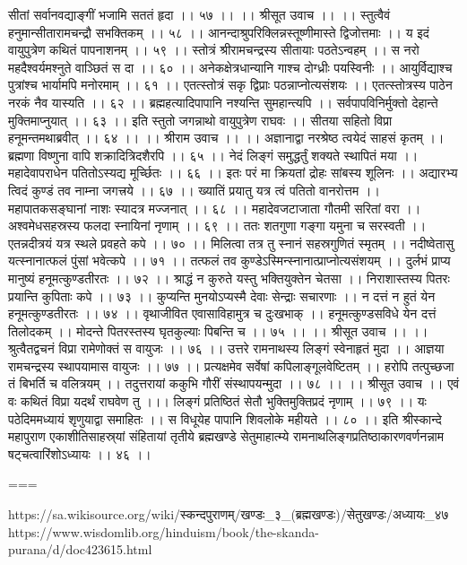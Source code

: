 सीतां सर्वानवद्याङ्गीं भजामि सततं हृदा ।। ५७ ।।
।। श्रीसूत उवाच ।। ।।
स्तुत्वैवं हनुमान्सीतारामचन्द्रौ सभक्तिकम् ।। ५८ ।।
आनन्दाश्रुपरिक्लिन्नस्तूष्णीमास्ते द्विजोत्तमाः ।।
य इदं वायुपुत्रेण कथितं पापनाशनम् ।। ५९ ।।
स्तोत्रं श्रीरामचन्द्रस्य सीतायाः पठतेऽन्वहम् ।।
स नरो महदैश्वर्यमश्नुते वाञ्छितं स दा ।। ६० ।।
अनेकक्षेत्रधान्यानि गाश्च दोग्ध्रीः पयस्विनीः ।।
आयुर्विद्याश्च पुत्रांश्च भार्यामपि मनोरमाम् ।। ६१ ।।
एतत्स्तोत्रं सकृ द्विप्राः पठन्नाप्नोत्यसंशयः ।।
एतत्स्तोत्रस्य पाठेन नरकं नैव यास्यति ।। ६२ ।।
ब्रह्महत्यादिपापानि नश्यन्ति सुमहान्त्यपि ।।
सर्वपापविनिर्मुक्तो देहान्ते मुक्तिमाप्नुयात् ।। ६३ ।।
इति स्तुतो जगन्नाथो वायुपुत्रेण राघवः ।।
सीतया सहितो विप्रा हनूमन्तमथाब्रवीत् ।। ६४ ।।
।। श्रीराम उवाच ।। ।।
अज्ञानाद्वा नरश्रेष्ठ त्वयेदं साहसं कृतम् ।।
ब्रह्मणा विष्णुना वापि शक्रादित्रिदशैरपि ।। ६५ ।।
नेदं लिङ्गं समुद्धर्तुं शक्यते स्थापितं मया ।।
महादेवापराधेन पतितोऽस्यद्य मूर्च्छितः ।। ६६ ।।
इतः परं मा क्रियतां द्रोहः सांबस्य शूलिनः ।।
अद्यारभ्य त्विदं कुण्डं तव नाम्ना जगत्त्रये ।। ६७ ।।
ख्यातिं प्रयातु यत्र त्वं पतितो वानरोत्तम ।।
महापातकसङ्घानां नाशः स्यादत्र मज्जनात् ।। ६८ ।।
महादेवजटाजाता गौतमी सरितां वरा ।।
अश्वमेधसहस्रस्य फलदा स्नायिनां नृणाम् ।। ६९ ।।
ततः शतगुणा गङ्गा यमुना च सरस्वती ।।
एतन्नदीत्रयं यत्र स्थले प्रवहते कपे ।। ७० ।।
मिलित्वा तत्र तु स्नानं सहस्रगुणितं स्मृतम् ।।
नदीष्वेतासु यत्स्नानात्फलं पुंसां भवेत्कपे ।। ७१ ।।
तत्फलं तव कुण्डेऽस्मिन्स्नानात्प्राप्नोत्यसंशयम् ।।
दुर्लभं प्राप्य मानुष्यं हनूमत्कुण्डतीरतः ।। ७२ ।।
श्राद्धं न कुरुते यस्तु भक्तियुक्तेन चेतसा ।।
निराशास्तस्य पितरः प्रयान्ति कुपिताः कपे ।। ७३ ।।
कुप्यन्ति मुनयोऽप्यस्मै देवाः सेन्द्राः सचारणाः ।।
न दत्तं न हुतं येन हनूमत्कुण्डतीरतः ।। ७४ ।।
वृथाजीवित एवासाविहामुत्र च दुःखभाक् ।।
हनूमत्कुण्डसविधे येन दत्तं तिलोदकम् ।।
मोदन्ते पितरस्तस्य घृतकुल्याः पिबन्ति च ।। ७५ ।।
।। श्रीसूत उवाच ।। ।।
श्रुत्वैतद्वचनं विप्रा रामेणोक्तं स वायुजः ।। ७६ ।।
उत्तरे रामनाथस्य लिङ्गं स्वेनाहृतं मुदा ।।
आज्ञया रामचन्द्रस्य स्थापयामास वायुजः ।। ७७ ।।
प्रत्यक्षमेव सर्वेषां कपिलाङ्गूलवेष्टितम् ।।
हरोपि तत्पुच्छजा तं बिभर्ति च वलित्रयम् ।।
तदुत्तरायां ककुभि गौरीं संस्थापयन्मुदा ।। ७८ ।।
।। श्रीसूत उवाच ।।
एवं वः कथितं विप्रा यदर्थं राघवेण तु ।।।
लिङ्गं प्रतिष्ठितं सेतौ भुक्तिमुक्तिप्रदं नृणाम् ।। ७९ ।।
यः पठेदिममध्यायं शृणुयाद्वा समाहितः ।।
स विधूयेह पापानि शिवलोके महीयते ।। ८० ।।
इति श्रीस्कान्दे महापुराण एकाशीतिसाहस्र्यां संहितायां तृतीये ब्रह्मखण्डे सेतुमाहात्म्ये रामनाथलिङ्गप्रतिष्ठाकारणवर्णनन्नाम षट्चत्वारिंशोऽध्यायः ।। ४६ ।।

===

https://sa.wikisource.org/wiki/स्कन्दपुराणम्/खण्डः_३_(ब्रह्मखण्डः)/सेतुखण्डः/अध्यायः_४७
https://www.wisdomlib.org/hinduism/book/the-skanda-purana/d/doc423615.html

